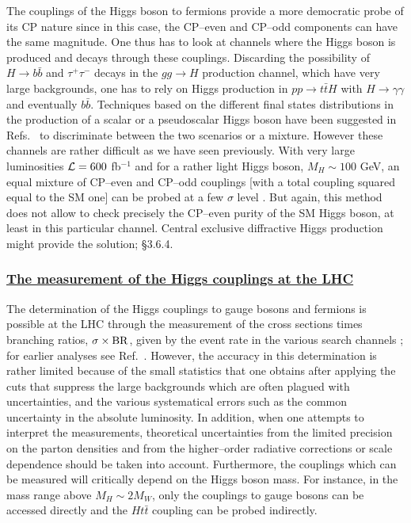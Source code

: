 The couplings of the Higgs boson to fermions provide a more democratic probe of
its CP nature since in this case, the CP--even and CP--odd components can have
the same magnitude. One thus has to look at channels where the Higgs boson is
produced and decays through these couplings. Discarding the possibility of
$H\to b\bar{b}$ and $\tau^+ \tau^-$ decays in the $gg\to H$ production channel,
which have very large backgrounds, one has to rely on Higgs production in $pp
\to t\bar tH$ with $H\to \gamma \gamma$ and eventually $b\bar b$. Techniques
based on the different final states distributions in the production of a scalar
or a pseudoscalar Higgs boson have been suggested in
Refs.~\cite{Spin-pp-G1,Spin-pp-Field} to discriminate between the two scenarios
or a mixture.  However these channels are rather difficult as we have seen
previously.  With very large luminosities ${\cal L}= 600$ fb$^{-1}$ and for a
rather light Higgs boson, $M_H \sim 100$ GeV, an equal mixture of CP--even and
CP--odd couplings [with a total coupling squared equal to the SM one] can be
probed at a few $\sigma$ level \cite{Spin-pp-Field}. But again, this method does
not allow to check precisely the CP--even purity of the SM Higgs boson, at 
least in this particular channel. Central exclusive diffractive Higgs production
\cite{diff-spin,John-new} might provide the solution; \S3.6.4.  

\subsubsection*{\underline{The measurement of the Higgs couplings at the LHC}}

The determination of the Higgs couplings to gauge bosons and fermions is
possible at the LHC through the measurement of the cross sections times
branching ratios, $\sigma \times  {\rm BR}$, given by the event rate in the 
various search channels \cite{Zepp-meas,Duhrssen,Duhrssen2,Snow-meas,SLHC+VLHC};
for earlier analyses see Ref.~\cite{ATLAS-TP,CMS-TDR,ATLAS-TDR}. However,
the accuracy in this determination is rather limited because of the small
statistics that one obtains after applying the cuts that suppress the large
backgrounds which are often plagued with uncertainties, and the various
systematical errors such as the common uncertainty in the absolute luminosity.
In addition, when one attempts to interpret the measurements, theoretical
uncertainties from the limited precision on the parton densities and from the
higher--order radiative corrections or scale dependence should be taken into
account. Furthermore, the couplings which can be measured will critically
depend on the Higgs boson mass. For instance, in the mass range above $M_H \sim
2M_W$, only the couplings to gauge bosons can be accessed directly and 
the $Ht\bar t$ coupling can be probed indirectly.\s

